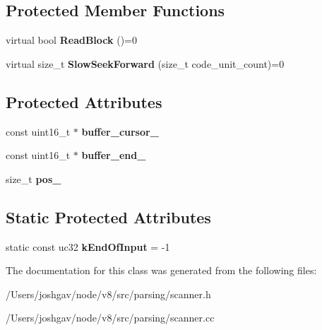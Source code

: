 \subsection*{Protected Member Functions}
\begin{DoxyCompactItemize}
\item 
virtual bool {\bfseries Read\+Block} ()=0\hypertarget{classv8_1_1internal_1_1_utf16_character_stream_a1b78e988d057208df027c0c83431d590}{}\label{classv8_1_1internal_1_1_utf16_character_stream_a1b78e988d057208df027c0c83431d590}

\item 
virtual size\+\_\+t {\bfseries Slow\+Seek\+Forward} (size\+\_\+t code\+\_\+unit\+\_\+count)=0\hypertarget{classv8_1_1internal_1_1_utf16_character_stream_a3fc5f6f1fc8e66676e0d1d4360ff4b63}{}\label{classv8_1_1internal_1_1_utf16_character_stream_a3fc5f6f1fc8e66676e0d1d4360ff4b63}

\end{DoxyCompactItemize}
\subsection*{Protected Attributes}
\begin{DoxyCompactItemize}
\item 
const uint16\+\_\+t $\ast$ {\bfseries buffer\+\_\+cursor\+\_\+}\hypertarget{classv8_1_1internal_1_1_utf16_character_stream_ac90ab8606aa8b34c62cb4d0005fe64a6}{}\label{classv8_1_1internal_1_1_utf16_character_stream_ac90ab8606aa8b34c62cb4d0005fe64a6}

\item 
const uint16\+\_\+t $\ast$ {\bfseries buffer\+\_\+end\+\_\+}\hypertarget{classv8_1_1internal_1_1_utf16_character_stream_a13a08f07ebe18c4632db92a4e9f19e7c}{}\label{classv8_1_1internal_1_1_utf16_character_stream_a13a08f07ebe18c4632db92a4e9f19e7c}

\item 
size\+\_\+t {\bfseries pos\+\_\+}\hypertarget{classv8_1_1internal_1_1_utf16_character_stream_a33c39f52f67b67ad78f1fba3ee162878}{}\label{classv8_1_1internal_1_1_utf16_character_stream_a33c39f52f67b67ad78f1fba3ee162878}

\end{DoxyCompactItemize}
\subsection*{Static Protected Attributes}
\begin{DoxyCompactItemize}
\item 
static const uc32 {\bfseries k\+End\+Of\+Input} = -\/1\hypertarget{classv8_1_1internal_1_1_utf16_character_stream_ab9485ef6f823b9629ad87a3070f9448a}{}\label{classv8_1_1internal_1_1_utf16_character_stream_ab9485ef6f823b9629ad87a3070f9448a}

\end{DoxyCompactItemize}


The documentation for this class was generated from the following files\+:\begin{DoxyCompactItemize}
\item 
/\+Users/joshgav/node/v8/src/parsing/scanner.\+h\item 
/\+Users/joshgav/node/v8/src/parsing/scanner.\+cc\end{DoxyCompactItemize}
